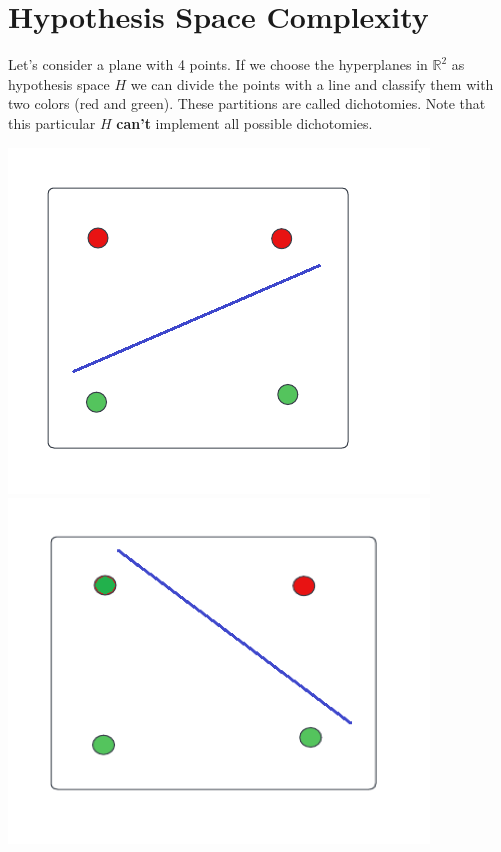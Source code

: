 \section{Hypothesis Space Complexity}
Let's consider a plane with 4 points. If we choose the hyperplanes in $\mathbb{R}^{2}$ as hypothesis space $H$ we can divide the points with a line and classify them with two colors (red and green). These partitions are called dichotomies. Note that this particular $H$ \textbf{can't} implement all possible dichotomies.
\begin{center}
    \includegraphics{images/Dichotomy 1.png}
    \includegraphics{images/Dichotomy 2.png}
\end{center}

